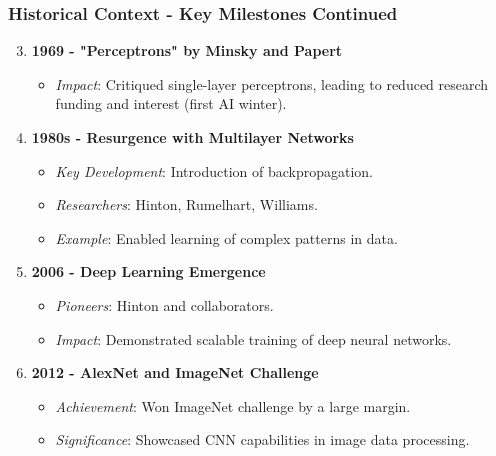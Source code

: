 \documentclass{beamer}
\begin{document}
\begin{frame}[fragile]
    \frametitle{Historical Context - Key Milestones Continued}
    \begin{enumerate}
        \setcounter{enumi}{2}
        
        \item \textbf{1969 - "Perceptrons" by Minsky and Papert}
            \begin{itemize}
                \item \textit{Impact}: Critiqued single-layer perceptrons, leading to reduced research funding and interest (first AI winter).
            \end{itemize}
        
        \item \textbf{1980s - Resurgence with Multilayer Networks}
            \begin{itemize}
                \item \textit{Key Development}: Introduction of backpropagation.
                \item \textit{Researchers}: Hinton, Rumelhart, Williams.
                \item \textit{Example}: Enabled learning of complex patterns in data.
            \end{itemize}
        
        \item \textbf{2006 - Deep Learning Emergence}
            \begin{itemize}
                \item \textit{Pioneers}: Hinton and collaborators.
                \item \textit{Impact}: Demonstrated scalable training of deep neural networks.
            \end{itemize}

        \item \textbf{2012 - AlexNet and ImageNet Challenge}
            \begin{itemize}
                \item \textit{Achievement}: Won ImageNet challenge by a large margin.
                \item \textit{Significance}: Showcased CNN capabilities in image data processing.
            \end{itemize}
    \end{enumerate}
\end{frame}
\end{document}
